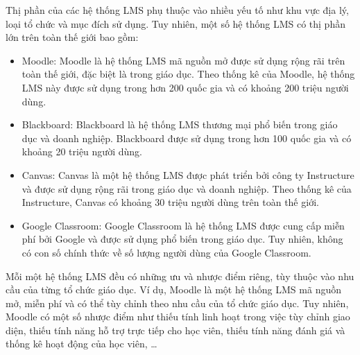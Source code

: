 \documentclass[../Thesis.tex]{subfiles}
\begin{document}
Thị phần của các hệ thống LMS phụ thuộc vào nhiều yếu tố như khu vực địa lý, loại tổ chức và mục đích sử dụng. Tuy nhiên, một số hệ thống LMS có thị phần lớn trên toàn thế giới bao gồm:

\begin{itemize}
    \item Moodle: Moodle là hệ thống LMS mã nguồn mở được sử dụng rộng rãi trên toàn thế giới, đặc biệt là trong giáo dục. Theo thống kê của Moodle, hệ thống LMS này được sử dụng trong hơn 200 quốc gia và có khoảng 200 triệu người dùng.
    \item Blackboard: Blackboard là hệ thống LMS thương mại phổ biến trong giáo dục và doanh nghiệp. Blackboard được sử dụng trong hơn 100 quốc gia và có khoảng 20 triệu người dùng.
    \item Canvas: Canvas là một hệ thống LMS được phát triển bởi công ty Instructure và được sử dụng rộng rãi trong giáo dục và doanh nghiệp. Theo thống kê của Instructure, Canvas có khoảng 30 triệu người dùng trên toàn thế giới.
    \item Google Classroom: Google Classroom là hệ thống LMS được cung cấp miễn phí bởi Google và được sử dụng phổ biến trong giáo dục. Tuy nhiên, không có con số chính thức về số lượng người dùng của Google Classroom.
\end{itemize}

Mỗi một hệ thống LMS đều có những ưu và nhược điểm riêng, tùy thuộc vào nhu cầu của từng tổ chức giáo dục. 
Ví dụ, Moodle là một hệ thống LMS mã nguồn mở, miễn phí và có thể tùy chỉnh theo nhu cầu của tổ chức giáo dục. Tuy nhiên, Moodle có một số nhược điểm như thiếu tính linh hoạt trong việc tùy chỉnh giao diện, thiếu tính năng hỗ trợ trực tiếp cho học viên, thiếu tính năng đánh giá và thống kê hoạt động của học viên, …
\end{document}
